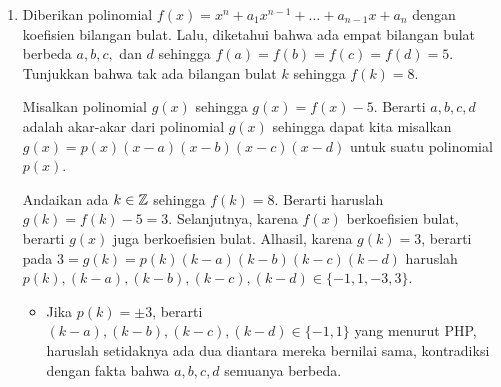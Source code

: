 \documentclass[12pt]{scrartcl}
\begin{document}
\begin{enumerate}[resume]
\begin{solusi}
		Dari fakta-fakta tersebut, didapat $\dangle A_BA_1A = \dangle AA_1A_C = 90^\circ$, maka $A_B, A_1, A_C$ segaris dan juga didapat bahwa $AA_1$ adalah garis tinggi $\triangle AA_BA_C$.
		
		Sekarang, misalkan $H_A$ adalah perpotongan antara $CA_C$ dan $BA_B$, maka $\angle ACH_A = \angle H_ABA = 90^\circ$ yang mengakibatkan $H_A$ adalah titik tinggi $\triangle AA_CA_B$ sekaligus $AH_A$ menjadi diameter lingkaran luar $\triangle ABC$. Karena $AA_1$ adalah garis tinggi $\triangle AA_BA_C$, maka $H_A$ berada di garis $AA_1$.
		
		Definisikan $H_B$ dan $H_C$ secara serupa dengan definisi $H_A$,maka didapat pula bahwa $H_B$ dan $H_C$ berturut-turut berada di garis $BB_1$ dan $CC_1$. Oleh karena itu, $AH_A$, $BH_B$, dan $CH_C$ adalah diameter lingkaran luar $\triangle ABC$, maka didapat $AH_A$, $BH_B$, dan $CH_C$ berpotongan di satu titik yaitu pusat lingkaran. Karena $A_1,B_1,C_1$ berturut-turut ada di garis $AH_A$, $BH_B$, $CH_C$ maka hal ini berakibat $AA_1$, $BB_1$, dan $CC_1$ berpotongan di satu titik. \qed
    \end{solusi}

    \item Diberikan polinomial $f(x)=x^n+a_1x^{n-1}+\dots+a_{n-1}x+a_n$ dengan koefisien bilangan bulat. Lalu, diketahui bahwa ada empat bilangan bulat berbeda $a,b,c,$ dan $d$ sehingga $f(a)=f(b)=f(c)=f(d)=5$. Tunjukkan bahwa tak ada bilangan bulat $k$ sehingga $f(k)=8$.
    \begin{solusi}
        Misalkan polinomial $g(x)$ sehingga $g(x)=f(x)-5$. Berarti $a,b,c,d$ adalah akar-akar dari polinomial $g(x)$ sehingga dapat kita misalkan $g(x)=p(x)(x-a)(x-b)(x-c)(x-d)$ untuk suatu polinomial $p(x)$.
        
        Andaikan ada $k \in \mathbb Z$ sehingga $f(k)=8$. Berarti haruslah $g(k)=f(k)-5=3$. Selanjutnya, karena $f(x)$ berkoefisien bulat, berarti $g(x)$ juga berkoefisien bulat. Alhasil, karena $g(k)=3$, berarti pada $3=g(k)=p(k)(k-a)(k-b)(k-c)(k-d)$ haruslah \\$p(k), (k-a), (k-b), (k-c), (k-d) \in \{-1,1,-3,3\}.$
        
        \begin{itemize}
        \item Jika $p(k)=\pm 3$, berarti $(k-a), (k-b), (k-c), (k-d) \in \{-1,1\}$ yang menurut PHP, haruslah setidaknya ada dua diantara mereka bernilai sama, kontradiksi dengan fakta bahwa $a,b,c,d$ semuanya berbeda.
                        

\end{itemize}
\end{solusi}
\end{enumerate}
\end{document}
